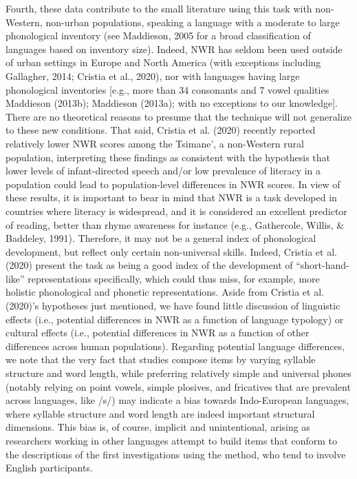\documentclass[english,,man,floatsintext]{apa6}
\begin{document}
Fourth, these data contribute to the small literature using this task with non-Western, non-urban populations, speaking a language with a moderate to large phonological inventory (see Maddieson, 2005 for a broad classification of languages based on inventory size). Indeed, NWR has seldom been used outside of urban settings in Europe and North America (with exceptions including Gallagher, 2014; Cristia et al., 2020), nor with languages having large phonological inventories {[}e.g., more than 34 consonants and 7 vowel qualities Maddieson (2013b); Maddieson (2013a); with no exceptions to our knowledge{]}. There are no theoretical reasons to presume that the technique will not generalize to these new conditions. That said, Cristia et al. (2020) recently reported relatively lower NWR scores among the Tsimane', a non-Western rural population, interpreting these findings as consistent with the hypothesis that lower levels of infant-directed speech and/or low prevalence of literacy in a population could lead to population-level differences in NWR scores. In view of these results, it is important to bear in mind that NWR is a task developed in countries where literacy is widespread, and it is considered an excellent predictor of reading, better than rhyme awareness for instance (e.g., Gathercole, Willis, \& Baddeley, 1991). Therefore, it may not be a general index of phonological development, but reflect only certain non-universal skills. Indeed, Cristia et al. (2020) present the task as being a good index of the development of \enquote{short-hand-like} representations specifically, which could thus miss, for example, more holistic phonological and phonetic representations. Aside from Cristia et al. (2020)'s hypotheses just mentioned, we have found little discussion of linguistic effects (i.e., potential differences in NWR as a function of language typology) or cultural effects (i.e., potential differences in NWR as a function of other differences across human populations). Regarding potential language differences, we note that the very fact that studies compose items by varying syllable structure and word length, while preferring relatively simple and universal phones (notably relying on point vowels, simple plosives, and fricatives that are prevalent across languages, like /s/) may indicate a bias towards Indo-European languages, where syllable structure and word length are indeed important structural dimensions. This bias is, of course, implicit and unintentional, arising as researchers working in other languages attempt to build items that conform to the descriptions of the first investigations using the method, who tend to involve English participants.
\end{document}
